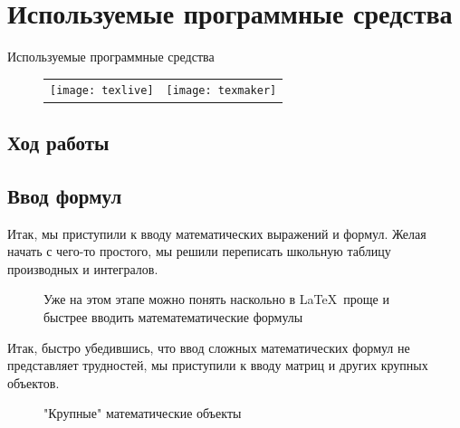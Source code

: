 \documentclass{beamer}[aspectratio=169]
\begin{document}
\section{Используемые программные средства}
\begin{frame}{Используемые программные средства}
\transwipe
\begin{figure}[h]
\begin{tabular}{cc}
\texttt{[image: texlive]}
&
\texttt{[image: texmaker]}
\end{tabular}
\end{figure}

\end{frame}

\begin{frame}
\section{Ход работы}
\subsection{Ввод формул}
\transwipe
Итак, мы приступили к вводу математических выражений и формул. Желая начать с чего-то простого, мы решили переписать школьную таблицу производных и интегралов.
\begin{figure}[h!]
\setlength{\fboxsep}{0pt}%
\setlength{\fboxrule}{1pt}%
%
\caption{Уже на этом этапе можно понять наскольно в \LaTeX \  проще и быстрее вводить математематические формулы}
\label{fig:image}
\end{figure}
\end{frame}


\begin{frame}
\transwipe
Итак, быстро убедившись, что ввод сложных математических формул не представляет трудностей, мы приступили к вводу матриц и других крупных объектов.
\begin{figure}[h!]
\setlength{\fboxsep}{0pt}%
\setlength{\fboxrule}{1pt}%
%
\caption{"Крупные" математические объекты}
\end{figure}
\end{frame}
\end{document}
